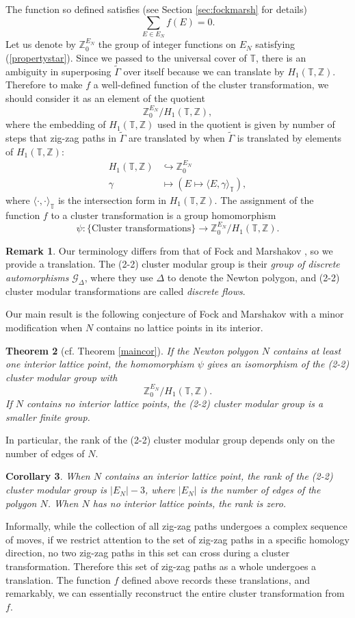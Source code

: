 \documentclass[11pt]{article} %
\newtheorem{theorem}{Theorem}[section]
\newtheorem{corollary}[theorem]{Corollary}
\theoremstyle{definition}
\newtheorem{remark}[theorem]{Remark}
\newcommand{\Z}{{\mathbb Z}}
\newcommand{\T}{{\mathbb T}}
\newcommand{\ra}{\rightarrow}
\newcommand{\be}{\begin{equation}}
\newcommand{\ee}{\end{equation}}
\newcommand{\la}{\label}
\begin{document}
The function so defined satisfies (see Section \ref{sec:fockmarsh} for details) 
\be \la{propertystar}
\sum_{E \in E_N}f(E)=0. 
\ee
Let us denote by $\Z^{E_N}_0$ the group of integer functions on $E_N$ satisfying (\ref{propertystar}). Since we passed to the universal cover of $\T$, there is an ambiguity in superposing $\widetilde \Gamma$ over itself because we can translate by $H_1(\T,\Z)$. Therefore to make $f$ a well-defined function of the cluster transformation, we should consider it as an element of the quotient $$\Z^{E_N}_0/H_1(\mathbb T,\Z),$$ where the embedding of $H_1(\T,\Z)$ used in the quotient is given by number of steps that zig-zag paths in $\widetilde{\Gamma}$ are translated by when $\widetilde{\Gamma}$ is translated by elements of $H_1(\mathbb T,\Z)$:
\begin{align*}
    H_1(\mathbb T,\Z) &\hookrightarrow \Z^{E_N}_0\\
    \gamma &\mapsto \left(E \mapsto \langle E,\gamma \rangle_\T \right),
\end{align*}
where $\langle \cdot, \cdot \rangle_\T$ is the intersection form in $H_1(\T,\Z)$. The assignment of the function $f$ to a cluster transformation is a group homomorphism 
\[
\psi:\{\text{Cluster transformations}\} \ra \Z^{E_N}_0/H_1(\T,\Z).
\]
\begin{remark}
Our terminology differs from that of Fock and Marshakov \cite{FM16}, so we provide a translation. The (2-2) cluster modular group is their \textit{group of discrete automorphisms} $\mathcal G_\Delta$, where they use $\Delta$  to denote the Newton polygon, and (2-2) cluster modular transformations are called \textit{discrete flows}.
\end{remark}
Our main result is the following conjecture of Fock and Marshakov \cite{FM16} with a minor modification when $N$ contains no lattice points in its interior.

\begin{theorem}[cf. Theorem \ref{maincor}]\label{mainthm2}
If the Newton polygon $N$ contains at least one interior lattice point, the homomorphism $\psi$ gives an isomorphism of the (2-2) cluster modular group with
\[
\Z^{E_N}_0/H_1(\mathbb T,\Z).
\]
 If $N$ contains no interior lattice points, the (2-2) cluster modular group is a smaller finite group.
\end{theorem}
In particular, the rank of the (2-2) cluster modular group depends only on the number of edges of $N$.
\begin{corollary}\label{rank1}
When $N$ contains an interior lattice point, the rank of the (2-2) cluster modular group is $|E_N|-3$, where $|E_N|$ is the number of edges of the polygon $N$. When $N$ has no interior lattice points, the rank is zero.
\end{corollary}
Informally, while the collection of all zig-zag paths undergoes a complex sequence of moves, if we restrict attention to the set of zig-zag paths in a specific homology direction, no two zig-zag paths in this set can cross during a cluster transformation. Therefore this set of zig-zag paths as a whole undergoes a translation. The function $f$ defined above records these translations, and remarkably,  we can essentially reconstruct the entire cluster transformation from $f$. 
\end{document}
